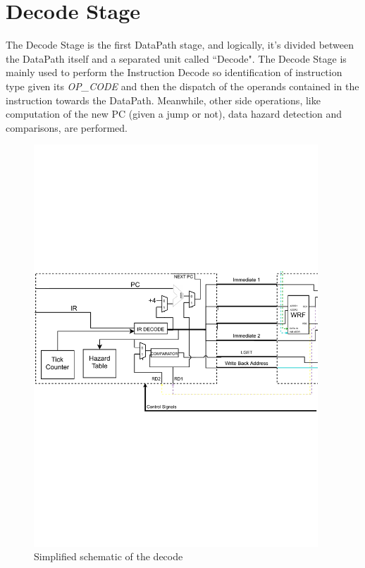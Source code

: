 \chapter{Decode Stage}
\label{sec:decode_stage}

The Decode Stage is the first DataPath stage, and logically, it's divided between the DataPath itself and a separated unit called ``Decode". The Decode Stage is mainly used to perform the Instruction Decode so identification of instruction type given its \emph{OP\_CODE} and then the dispatch of the operands contained in the instruction towards the DataPath. Meanwhile, other side operations, like computation of the new PC (given a jump or not), data hazard detection and comparisons, are performed.

\begin{figure}[H]
  \centering
  \includegraphics[width=0.95\textwidth]{chapters/4_DecodeStage/images/Decode_stage_focus.pdf}
  \caption{Simplified schematic of the decode}
  \label{decode_block_focus}
\end{figure}

